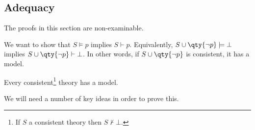 \subsection{Adequacy}
The proofs in this section are non-examinable.

We want to show that $S \models p$ implies $S \vdash p$.
Equivalently, $S \cup \qty{\neg p} \models \bot$ implies $S \cup \qty{\neg p} \vdash \bot$.
In other words, if $S \cup \qty{\neg p}$ is consistent, it has a model.

\begin{theorem} \label{thm:predmodel}
    Every consistent\footnote{If $S$ a consistent theory then $S \not\vdash \bot$.} theory has a model.
\end{theorem}



We will need a number of key ideas in order to prove this.

